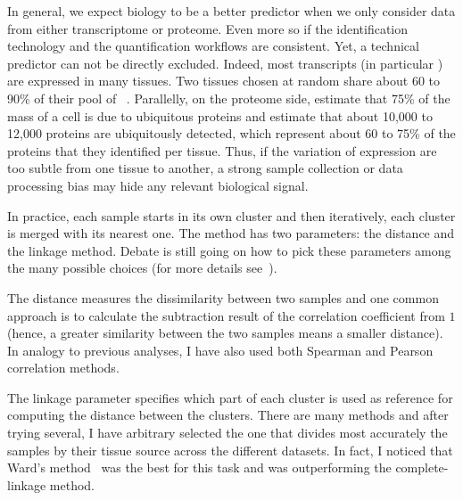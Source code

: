 In general, we expect biology to be a better predictor when we only consider
data from either transcriptome or proteome. Even more so if the
identification technology and the quantification workflows are
consistent. Yet, a technical predictor can not be directly excluded.
Indeed, most transcripts (in particular \mRNAs) are expressed in many tissues.
Two tissues chosen at random share about 60 to 90\% of their pool of
\mRNAs~.
Parallelly, on the proteome side, \citet{PandeyData}
estimate that 75\% of the mass of a cell is due to ubiquitous proteins and
\citet{KusterData} estimate that about 10,000
to 12,000 proteins are ubiquitously detected, which represent about 60 to 75\%
of the proteins that they identified per tissue. Thus, if the variation of
expression are too subtle from one tissue to another, a strong sample collection
or data processing bias may hide any relevant biological signal.

In practice, each sample starts in its own cluster and then
iteratively, each cluster is merged with its nearest one.
The method has two parameters: the distance and the linkage method.
Debate is still going on how to pick these parameters among the many possible
choices (for more details see~).

The distance measures the dissimilarity between two samples and one common
approach is to calculate the subtraction result of
the correlation coefficient from $1$ (hence, a greater similarity between the two
samples means a smaller distance).
In analogy to previous analyses, I have also used both Spearman
and Pearson correlation methods.

The linkage parameter specifies which part of each cluster is used as reference
for computing the distance between the clusters. There are many methods and after
trying several, I have arbitrary selected the one that divides most accurately
the samples by their tissue source across the different datasets.
In fact, I noticed that Ward's method~
was the best for this task and was outperforming the complete-linkage method.

